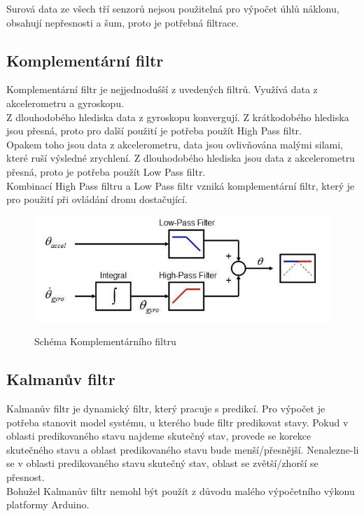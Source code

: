 Surová data ze všech tří senzorů nejsou použitelná pro výpočet úhlů náklonu, obsahují nepřesnosti a šum, proto je potřebná filtrace.\\


\subsection{Komplementární filtr}
Komplementární filtr je nejjednodušší z uvedených filtrů. Využívá data z akcelerometru a gyroskopu. \\
Z dlouhodobého hlediska data z gyroskopu konvergují. Z krátkodobého hlediska jsou přesná, proto pro další použití je potřeba použít High Pass filtr.\\
Opakem toho jsou data z akcelerometru, data jsou ovlivňována malými silami, které ruší výsledné zrychlení. Z dlouhodobého hlediska jsou data z akcelerometru přesná, proto je potřeba použít Low Pass filtr.\\
Kombinací High Pass filtru a Low Pass filtr vzniká komplementární filtr, který je pro použití při ovládání dronu dostačující.\\
\begin{figure}[H]
	\centering
	\includegraphics[width=15cm]{pictures/complementary.jpg}
	\caption{Schéma Komplementárního filtru}
	\cite{complementary}
\end{figure}



\subsection{Kalmanův filtr}
Kalmanův filtr je dynamický filtr, který pracuje s predikcí. Pro výpočet je potřeba stanovit model systému, u kterého bude filtr predikovat stavy. Pokud v oblasti predikovaného stavu najdeme skutečný stav, provede se korekce skutečného stavu a oblast predikovaného stavu bude menší/přesnější. Nenalezne-li se v oblasti predikovaného stavu skutečný stav, oblast se zvětší/zhorší se přesnost.\\
Bohužel Kalmanův filtr nemohl být použít z důvodu malého výpočetního výkonu platformy Arduino.

